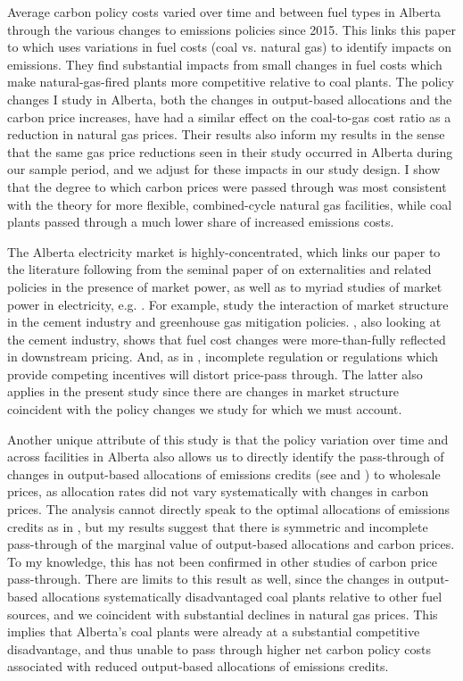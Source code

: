 \documentclass[12pt]{article}
\begin{document}
Average carbon policy costs varied over time and between fuel types in Alberta through the various changes to emissions policies since 2015. This links this paper to \cite{cullen_mansur} which uses variations in fuel costs (coal vs. natural gas) to identify impacts on emissions. They find substantial impacts from small changes in fuel costs which make natural-gas-fired plants more competitive relative to coal plants. The policy changes I study in Alberta, both the changes in output-based allocations and the carbon price increases, have had a similar effect on the coal-to-gas cost ratio as a reduction in natural gas prices. Their results also inform my results in the sense that the same gas price reductions seen in their study occurred in Alberta during our sample period, and we adjust for these impacts in our study design. I show that the degree to which carbon prices were passed through was most consistent with the theory for more flexible, combined-cycle natural gas facilities, while coal plants passed through a much lower share of increased emissions costs.

The Alberta electricity market is highly-concentrated, which links our paper to the literature following from the seminal paper of \cite{buchanan1969external} on externalities and related policies in the presence of market power, as well as to myriad studies of market power in electricity, e.g. \cite{borenstein_bushnell_wolak_2002}. For example, \cite{fowlie_reguant_ryan_2016} study the interaction of market structure in the cement industry and greenhouse gas mitigation policies. \cite{miller_cement}, also looking at the cement industry, shows that fuel cost changes were more-than-fully reflected in downstream pricing. And, as in \cite{holland_emissions_2012}, incomplete regulation or regulations which provide competing incentives will distort price-pass through. The latter also applies in the present study since there are changes in market structure coincident with the policy changes we study for which we must account. 

Another unique attribute of this study is that the policy variation over time and across facilities in Alberta also allows us to directly identify the pass-through of changes in output-based allocations of emissions credits (see \cite{fischerfox07} and \cite{fischerfox12}) to wholesale prices, as allocation rates did not vary systematically with changes in carbon prices. The analysis cannot directly speak to the optimal allocations of emissions credits as in \cite{burtraw_palmer_2008}, but my results suggest that there is symmetric and incomplete pass-through of the marginal value of output-based allocations and carbon prices. To my knowledge, this has not been confirmed in other studies of carbon price pass-through. There are limits to this result as well, since the changes in output-based allocations systematically disadvantaged coal plants relative to other fuel sources, and we coincident with substantial declines in natural gas prices. This implies that Alberta's coal plants were already at a substantial competitive disadvantage, and thus unable to pass through higher net carbon policy costs associated with reduced output-based allocations of emissions credits.
\end{document}
